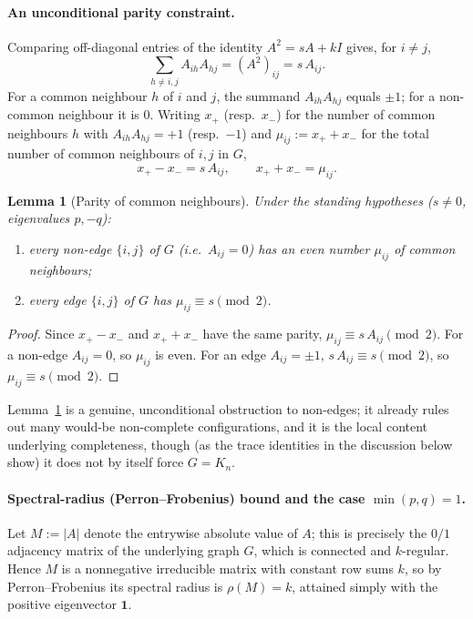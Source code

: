 \documentclass{amsart}
\newtheorem{lemma}{Lemma}
\theoremstyle{definition}
\begin{document}
\paragraph{An unconditional parity constraint.}
Comparing off-diagonal entries of the identity $A^2=sA+kI$ gives, for $i\ne j$,
\[
\sum_{h\ne i,j}A_{ih}A_{hj}=(A^2)_{ij}=s\,A_{ij}.
\]
For a common neighbour $h$ of $i$ and $j$, the summand $A_{ih}A_{hj}$ equals
$\pm1$; for a non-common neighbour it is $0$. Writing $x_+$ (resp.\ $x_-$) for
the number of common neighbours $h$ with $A_{ih}A_{hj}=+1$ (resp.\ $-1$) and
$\mu_{ij}:=x_++x_-$ for the total number of common neighbours of $i,j$ in $G$,
\[
x_+-x_-=s\,A_{ij},\qquad x_++x_-=\mu_{ij}.
\]

\begin{lemma}[Parity of common neighbours]\label{lem:parity}
Under the standing hypotheses ($s\ne0$, eigenvalues $p,-q$):
\begin{enumerate}
\item every non-edge $\{i,j\}$ of $G$ (i.e.\ $A_{ij}=0$) has an \emph{even}
number $\mu_{ij}$ of common neighbours;
\item every edge $\{i,j\}$ of $G$ has $\mu_{ij}\equiv s\pmod2$.
\end{enumerate}
\end{lemma}

\begin{proof}
Since $x_+-x_-$ and $x_++x_-$ have the same parity, $\mu_{ij}\equiv s\,A_{ij}
\pmod 2$. For a non-edge $A_{ij}=0$, so $\mu_{ij}$ is even. For an edge
$A_{ij}=\pm1$, $s\,A_{ij}\equiv s\pmod2$, so $\mu_{ij}\equiv s\pmod2$.
\end{proof}

Lemma~\ref{lem:parity} is a genuine, unconditional obstruction to non-edges; it
already rules out many would-be non-complete configurations, and it is the
local content underlying completeness, though (as the trace identities in the
discussion below show) it does not by itself force $G=K_n$.

\paragraph{Spectral-radius (Perron--Frobenius) bound and the case
$\min(p,q)=1$.}
Let $M:=|A|$ denote the entrywise absolute value of $A$; this is precisely the
$0/1$ adjacency matrix of the underlying graph $G$, which is connected and
$k$-regular. Hence $M$ is a nonnegative irreducible matrix with constant row
sums $k$, so by Perron--Frobenius its spectral radius is $\rho(M)=k$, attained
simply with the positive eigenvector $\mathbf1$.
\end{document}
